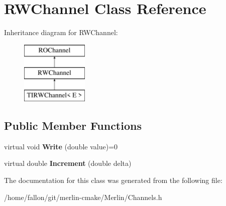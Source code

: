 \hypertarget{classRWChannel}{}\section{R\+W\+Channel Class Reference}
\label{classRWChannel}
Inheritance diagram for R\+W\+Channel\+:\begin{figure}[H]
\begin{center}
\leavevmode
\includegraphics[height=3.000000cm]{classRWChannel}
\end{center}
\end{figure}
\subsection*{Public Member Functions}
\begin{DoxyCompactItemize}
\item 
\mbox{\label{classRWChannel_a017cc5642572c1a2943e0142529e8262}} 
virtual void {\bfseries Write} (double value)=0
\item 
\mbox{\label{classRWChannel_a4f219851b7360b8c24acff6df79a800b}} 
virtual double {\bfseries Increment} (double delta)
\end{DoxyCompactItemize}


The documentation for this class was generated from the following file\+:\begin{DoxyCompactItemize}
\item 
/home/fallon/git/merlin-\/cmake/\+Merlin/Channels.\+h\end{DoxyCompactItemize}

